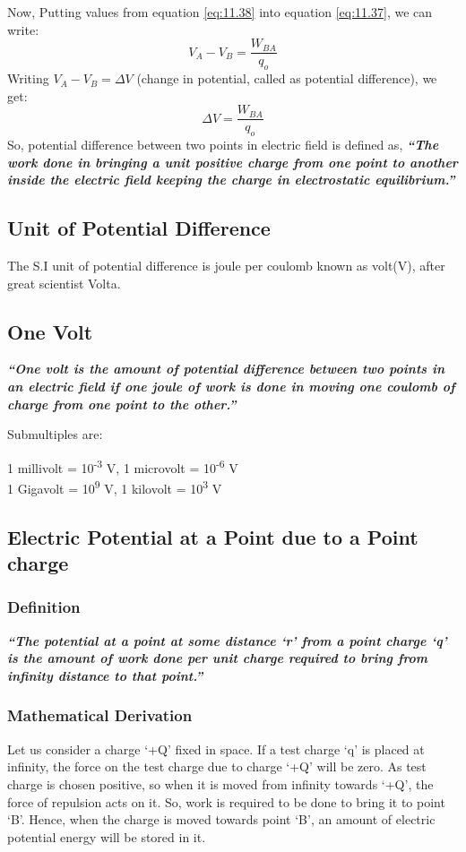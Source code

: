 Now, Putting values from equation \ref{eq:11.38} into equation \ref{eq:11.37}, we can
write:
\begin{equation}
  V_{A} - V_{B} = \frac{W_{BA}}{q_{o}} \nonumber
\end{equation}
Writing $V_{A} - V_{B} = \Delta V$ (change in potential, called as potential difference), we get:
\begin{equation}\label{eq:11.42}
  \Delta V = \frac{W_{BA}}{q_{o}}
\end{equation}
So, potential difference between two points in electric field is defined as,
\textit{\textbf{“The work done in bringing a unit positive charge from one point to another
inside the electric field keeping the charge in electrostatic equilibrium.”}}
\subsection*{Unit of Potential Difference}
The S.I unit of potential difference is joule per coulomb known 
as volt(V), after great scientist Volta.
\subsection*{One Volt}
\textit{\textbf{“One volt is the amount of potential difference between
two points in an electric field if one joule of work is done in moving
one coulomb of charge from one point to the other.”}}

\noindent Submultiples are:
\begin{center}
  1 millivolt = 10\textsuperscript{-3} V, 1 microvolt = 10\textsuperscript{-6} V \\
  1 Gigavolt = 10\textsuperscript{9} V, 1 kilovolt = 10\textsuperscript{3} V
\end{center}

\subsection{Electric Potential at a Point due to a Point charge}
\subsubsection{Definition}
\textit{\textbf{“The potential at a point at some distance ‘r’ from a point charge ‘q’ is the amount of work done per
unit charge required to bring from infinity distance to that point.”}}
\subsubsection{Mathematical Derivation}
Let us consider a charge ‘+Q’ fixed in space. If a test charge ‘q’ is placed
at infinity, the force on the test charge due to charge ‘+Q’ will be zero.
As test charge is chosen positive, so when it is moved from infinity towards ‘+Q’,
the force of repulsion acts on it. So, work is required to be done to bring it to
point ‘B’. Hence, when the charge is moved towards point ‘B’,
an amount of electric potential energy will be stored in it.

